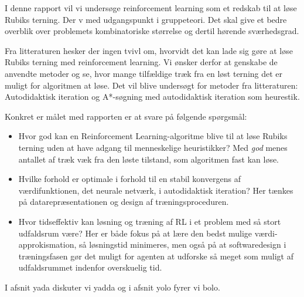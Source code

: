 \documentclass[../main.tex]{subfiles}
\begin{document}
I denne rapport vil vi undersøge reinforcement learning som et redskab til at løse Rubiks terning.
Der v med udgangspunkt i gruppeteori.
Det skal give et bedre overblik over problemets kombinatoriske størrelse og dertil hørende sværhedsgrad.

Fra litteraturen hesker der ingen tvivl om, hvorvidt det kan lade sig gøre at løse Rubiks terning med reinforcement learning.
Vi ønsker derfor at genskabe de anvendte metoder og se, hvor mange tilfældige træk fra en løst terning det er muligt for algoritmen at løse.
Det vil blive undersøgt for metoder fra litteraturen: Autodidaktisk iteration \cite{HumansBeGone} og A*-søgning med autodidaktisk iteration som heurestik.

Konkret er målet med rapporten er at svare på følgende spørgsmål:
\begin{itemize}
	\item Hvor god kan en Reinforcement Learning-algoritme blive til at løse Rubiks terning uden at have adgang til menneskelige heuristikker? Med \textit{god} menes antallet af træk væk fra den løste tilstand, som algoritmen fast kan løse.
	\item Hvilke forhold er optimale i forhold til en stabil konvergens af værdifunktionen, det neurale netværk, i autodidaktisk iteration? Her tænkes på datarepræsentationen og design af træningsproceduren.
	\item Hvor tidseffektiv kan løsning og træning af RL i et problem med så stort udfaldsrum være? Her er både fokus på  at lære den bedst mulige værdi-approkismation, så løsningstid minimeres, men også på at softwaredesign i træningsfasen gør det muligt for agenten at udforske så meget som muligt af udfaldsrummet indenfor overskuelig tid.
\end{itemize}
I afsnit yada diskuter vi yadda og i afsnit yolo fyrer vi bolo.


 
\end{document}
